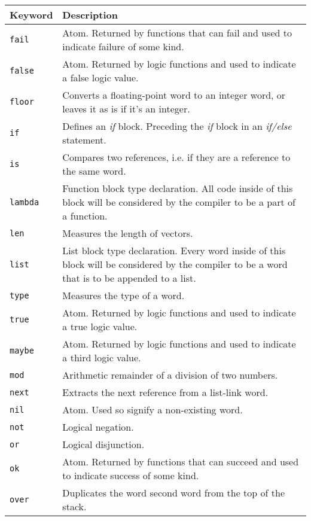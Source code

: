 \documentclass[12pt]{article}
\begin{document}
\begin{center}
\begin{tabular}{ | l | p{9cm} | }
\end{tabular}

\begin{tabular}{ | l | p{9cm} | }
\hline
\textbf{Keyword} & \textbf{Description} \\ \hline

\verb|fail| & Atom. Returned by functions that can fail and used to indicate failure of some kind. \\ \hline
\verb|false| & Atom. Returned by logic functions and used to indicate a false logic value. \\ \hline
\verb|floor| & Converts a floating-point word to an integer word, or leaves it as is if it's an integer. \\ \hline

\verb|if| & Defines an \emph{if} block. Preceding the \emph{if} block in an \emph{if/else} statement. \\ \hline
\verb|is| & Compares two references, i.e. if they are a reference to the same word. \\ \hline

\verb|lambda| & Function block type declaration. All code inside of this block will be considered by the compiler to be a part of a function. \\ \hline
\verb|len| & Measures the length of vectors. \\ \hline
\verb|list| & List block type declaration. Every word inside of this block will be considered by the compiler to be a word that is to be appended to a list. \\ \hline
\verb|type| & Measures the type of a word. \\ \hline

\verb|true| & Atom. Returned by logic functions and used to indicate a true logic value. \\ \hline
\verb|maybe| & Atom. Returned by logic functions and used to indicate a third logic value. \\ \hline
\verb|mod| & Arithmetic remainder of a division of two numbers. \\ \hline

\verb|next| & Extracts the next reference from a list-link word. \\ \hline

\verb|nil| & Atom. Used so signify a non-existing word. \\ \hline
\verb|not| & Logical negation. \\ \hline

\verb|or| & Logical disjunction. \\ \hline
\verb|ok| & Atom. Returned by functions that can succeed and used to indicate success of some kind.\\ \hline
\verb|over| & Duplicates the word second word from the top of the stack. \\ \hline


\end{tabular}
\end{center}
\end{document}
